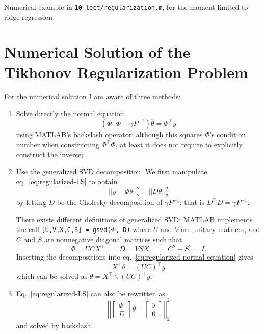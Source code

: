 Numerical example in \texttt{10\_lect/regularization.m}, for the moment limited to ridge regression.

\section{Numerical Solution of the Tikhonov Regularization Problem}
\label{sec:numerical-tikhonov}

For the numerical solution I am aware of three methods:
  \begin{enumerate}
  \item Solve directly the normal equation
    \begin{equation}
      \label{eq:regularized-normal-equation}
      \left(\Phi^\top\Phi + \gamma P^{-1}\right) \hat{\theta} = \Phi^\top y
    \end{equation} using MATLAB's backslash operator: although this squares $\Phi$'s condition number when constructing $\Phi^\top\Phi$, at least it does not require to explicitly construct the inverse;
  \item Use the generalized SVD decomposition.
    We first manipulate eq.~\eqref{eq:regularized-LS} to obtain
    \begin{equation*}
      ||y-\Phi \theta||_2^2 + ||D\theta||_2^2
    \end{equation*}
    by letting $D$ be the Cholesky decomposition of $\gamma P^{-1}$: that is $D^\top D = \gamma P^{-1}$.

    There exists different definitions of generalized SVD: MATLAB implements the call \texttt{[U,V,X,C,S] = gsvd($\Phi$, D)} where $U$ and $V$ are unitary matrices, and $C$ and $S$ are nonnegative diagonal matrices such that
    \begin{equation*}
      \Phi = UCX^\top\hspace{2em} D = VSX^\top\hspace{2em} C^2+S^2=I.
    \end{equation*}
    Inserting the decompositions into eq.~\eqref{eq:regularized-normal-equation} gives
    \begin{equation*}
      X^\top \theta = (UC)^\top y
    \end{equation*}
    which can be solved as $\theta = X^\top \backslash (UC)^\top y$;
  \item Eq.~\eqref{eq:regularized-LS} can also be rewritten as
    \begin{equation*}
      \left|\left|
          \begin{bmatrix}
            \Phi \\ D
          \end{bmatrix}\theta -
          \begin{bmatrix}
            y \\ 0
          \end{bmatrix}\right|\right|_2^2
    \end{equation*}
    and solved by backslash.


\end{enumerate}
